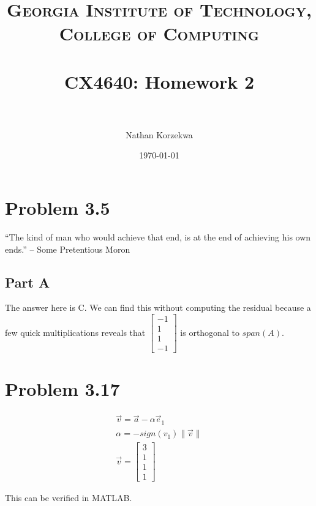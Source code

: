 \documentclass[paper=a4, fontsize=11pt]{scrartcl} %
\title {	
\normalfont \normalsize 
\textsc{Georgia Institute of Technology, College of Computing} \\ [25pt] %
\horrule{0.5pt} \\[0.4cm] %
\huge CX4640: Homework 2 \\ %
\horrule{2pt} \\[0.5cm] %
}
\author{Nathan Korzekwa} %
\date{\normalsize\today} %
\numberwithin{equation}{section} %
\numberwithin{figure}{section} %
\numberwithin{table}{section} %
\begin{document}
\maketitle %


\section*{Problem 3.5}
``The kind of man who would achieve that end, is at the end of achieving his own ends.'' -- Some Pretentious Moron \\


\subsection*{Part A}
	The answer here is C. We can find this without computing the residual because a few quick multiplications reveals that 
	$\left[\begin{array}{c}
		  -1\\
		   1\\
		   1\\
		   -1
		\end{array}\right]$ is orthogonal to $span(A)$.



\section*{Problem 3.17}
\begin{align*}
	\vec{v} = \vec{a} - \alpha\vec{e}_1 \\
	\alpha = -sign(v_1)\|\vec{v}\| \\
	\vec{v} = \left[\begin{array}{c}
			   3\\
			   1\\
			   1\\
			   1
			\end{array}\right] 
\end{align*}

This can be verified in MATLAB.
\end{document}
